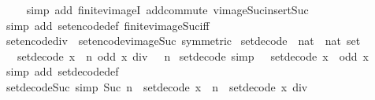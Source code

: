 \begin{isabellebody}
\ \ \ \isamarkupfalse%
\ {\isacharparenleft}simp\ add{\isacharcolon}\ finite{\isacharunderscore}vimageI\ add{\isachardot}commute\ vimage{\isacharunderscore}Suc{\isacharunderscore}insert{\isacharunderscore}Suc{\isacharparenright}\isanewline
\ \ \isamarkupfalse%
\ {\isacharparenleft}simp\ add{\isacharcolon}\ set{\isacharunderscore}encode{\isacharunderscore}def\ finite{\isacharunderscore}vimage{\isacharunderscore}Suc{\isacharunderscore}iff{\isacharparenright}\isanewline
\ \ \isamarkupfalse%
%
\endisatagproof
{\isafoldproof}%
%
\isadelimproof
\isanewline
%
\endisadelimproof
\isanewline
{}\isamarkupfalse%
\ set{\isacharunderscore}encode{\isacharunderscore}div{\isacharunderscore}{}\ {\isacharequal}\ set{\isacharunderscore}encode{\isacharunderscore}vimage{\isacharunderscore}Suc\ {\isacharbrackleft}symmetric{\isacharbrackright}%
\isadelimdocument
%
\endisadelimdocument
%
\isatagdocument
%
\isamarkuptrue%
%
\endisatagdocument
{\isafolddocument}%
%
\isadelimdocument
%
\endisadelimdocument
{}\isamarkupfalse%
\ set{\isacharunderscore}decode\ {\isacharcolon}{\isacharcolon}\ {\isachardoublequoteopen}nat\ {\isasymRightarrow}\ nat\ set{\isachardoublequoteclose}\isanewline
\ \ \ {\isachardoublequoteopen}set{\isacharunderscore}decode\ x\ {\isacharequal}\ {\isacharbraceleft}n{\isachardot}\ odd\ {\isacharparenleft}x\ div\ {}\ {\isacharcircum}\ n{\isacharparenright}{\isacharbraceright}{\isachardoublequoteclose}\isanewline
\isanewline
{}\isamarkupfalse%
\ set{\isacharunderscore}decode{\isacharunderscore}{}\ {\isacharbrackleft}simp{\isacharbrackright}{\isacharcolon}\ {\isachardoublequoteopen}{}\ {\isasymin}\ set{\isacharunderscore}decode\ x\ {\isasymlongleftrightarrow}\ odd\ x{\isachardoublequoteclose}\isanewline
%
\isadelimproof
\ \ %
\endisadelimproof
%
\isatagproof
{}\isamarkupfalse%
\ {\isacharparenleft}simp\ add{\isacharcolon}\ set{\isacharunderscore}decode{\isacharunderscore}def{\isacharparenright}%
\endisatagproof
{\isafoldproof}%
%
\isadelimproof
\isanewline
%
\endisadelimproof
\isanewline
{}\isamarkupfalse%
\ set{\isacharunderscore}decode{\isacharunderscore}Suc\ {\isacharbrackleft}simp{\isacharbrackright}{\isacharcolon}\ {\isachardoublequoteopen}Suc\ n\ {\isasymin}\ set{\isacharunderscore}decode\ x\ {\isasymlongleftrightarrow}\ n\ {\isasymin}\ set{\isacharunderscore}decode\ {\isacharparenleft}x\ div\ {}{\isacharparenright}{\isachardoublequoteclose}\isanewline

\end{isabellebody}
